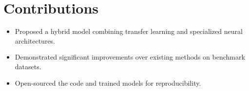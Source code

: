 \documentclass{article}
\begin{document}
\section{Contributions}
\begin{itemize}
    \item Proposed a hybrid model combining transfer learning and specialized neural architectures.
    \item Demonstrated significant improvements over existing methods on benchmark datasets.
    \item Open-sourced the code and trained models for reproducibility.
\end{itemize}
\end{document}
